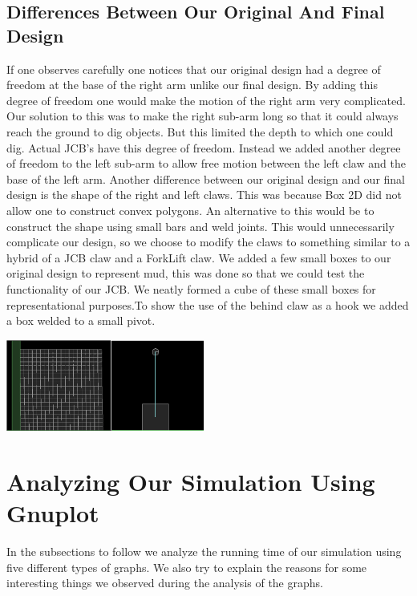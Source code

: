 \documentclass[11pt]{article}
\begin{document}
	\subsection{Differences Between Our Original And Final Design}
	If one observes carefully one notices that our original design had a degree of freedom at the base of the right arm unlike our final design. By adding this degree of freedom one would make the motion of the right arm very complicated. Our solution to this was to make the right sub-arm long so that it could always reach the ground to dig objects. But this limited the depth to which one could dig. Actual JCB's have this degree of freedom\cite{youtube}.
Instead we added another degree of freedom to the left sub-arm to allow free motion between the left claw and the base of the left arm.\newline
	Another difference between our original design and our final design is the shape of the right and left claws. This was because Box 2D did not allow one to construct convex polygons. An alternative to this would be to construct the shape using small bars and weld joints. This would unnecessarily complicate our design, so we choose to modify the claws to something similar to a hybrid of a JCB claw and a ForkLift claw\cite{wiki}.\newline
	 We added a few small boxes to our original design to represent mud, this was done so that we could test the functionality of our JCB. We neatly formed a cube of these small boxes for representational purposes.\newline To show the use of the behind claw as a hook we added a box welded to a small pivot.
	\begin{center}\includegraphics[height=3.0cm]{Boxes.png}\includegraphics[height=3.0cm]{Hang.png}\end{center}
\section{Analyzing Our Simulation Using Gnuplot}
	In the subsections to follow we analyze the running time of our simulation using five different types of graphs. We also try to explain the reasons for some interesting things we observed during the analysis of the graphs. 
\end{document}
